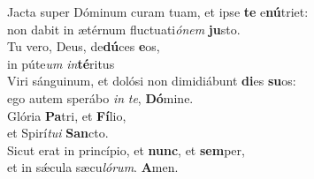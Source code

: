 \oddverse Jacta super Dóminum curam tuam, et ipse \textbf{te} e\textbf{nú}triet:~\*\\
\oddverse non dabit in ætérnum fluctuati\textit{ó}\textit{nem} \textbf{ju}sto.\\
\evenverse Tu vero, Deus, de\textbf{dú}ces \textbf{e}os,~\*\\
\evenverse in púte\textit{um} \textit{in}\textbf{té}ritus\\
\oddverse Viri sánguinum, et dolósi non dimidiábunt \textbf{di}es \textbf{su}os:~\*\\
\oddverse ego autem sperábo \textit{in} \textit{te}, \textbf{Dó}mine.\\
\evenverse Glória \textbf{Pa}tri, et \textbf{Fí}lio,~\*\\
\evenverse et Spirí\textit{tu}\textit{i} \textbf{San}cto.\\
\oddverse Sicut erat in princípio, et \textbf{nunc}, et \textbf{sem}per,~\*\\
\oddverse et in sǽcula sæcu\textit{ló}\textit{rum}. \textbf{A}men.\\
